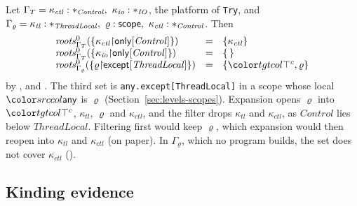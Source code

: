 \begin{example}\label{ex:cl-filter}
Let $\Gamma_{T} = \kappa_{\mathit{ctl}} : \ast_{\mathit{Control}},\ \kappa_{\mathit{io}} : \ast_{\mathit{IO}}$, the platform of \lstinline{Try}, and $\Gamma_{\varrho} = \kappa_{\mathit{tl}} : \ast_{\mathit{ThreadLocal}},\ \varrho : \mathsf{scope},\ \kappa_{\mathit{ctl}} : \ast_{\mathit{Control}}$. Then
\[
\begin{array}{@{}lcl@{}}
\rootsn{\Gamma_{T}}{0}{\cset{\restr{\kappa_{\mathit{ctl}}}{\konly{\mathit{Control}}}}} & = & \cset{\kappa_{\mathit{ctl}}} \\
\rootsn{\Gamma_{T}}{0}{\cset{\restr{\kappa_{\mathit{io}}}{\konly{\mathit{Control}}}}} & = & \cempty \\
\rootsn{\Gamma_{\varrho}}{0}{\cset{\restr{\varrho}{\kexcept{\mathit{ThreadLocal}}}}} & = & \cset{\topc, \varrho}
\end{array}
\]
by ,  and . The third set is \lstinline{any.except[ThreadLocal]} in a scope whose local $\cany$ is $\varrho$ (Section~\ref{sec:levels-scopes}). Expansion opens $\varrho$ into $\topc$, $\kappa_{\mathit{tl}}$, $\varrho$ and $\kappa_{\mathit{ctl}}$, and the filter drops $\kappa_{\mathit{tl}}$ and $\kappa_{\mathit{ctl}}$, as $\mathit{Control}$ lies below $\mathit{ThreadLocal}$. Filtering first would keep $\varrho$, which expansion would then reopen into $\kappa_{\mathit{tl}}$ and $\kappa_{\mathit{ctl}}$ (on paper). In $\Gamma_{\varrho}$, which no program builds, the set does not cover $\kappa_{\mathit{ctl}}$ ().
\end{example}

\subsection{Kinding evidence}\label{sec:cl-kinding}


